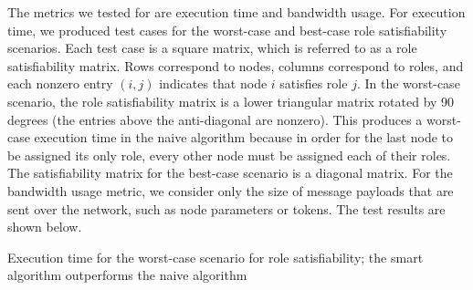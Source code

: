 \documentclass[11pt]{article}
\makeatletter
\newenvironment{figurehere}
{\def\@captype{figure}}
{}
\makeatother
\begin{document}
\begin{multicols}{2}
The metrics we tested for are execution time and bandwidth usage. For execution time, we produced test cases for the worst-case and best-case role satisfiability scenarios. Each test case is a square matrix, which is referred to as a role satisfiability matrix. Rows correspond to nodes, columns correspond to roles, and each nonzero entry $(i, j)$ indicates that node $i$ satisfies role $j$. In the worst-case scenario, the role satisfiability matrix is a lower triangular matrix rotated by 90 degrees (the entries above the anti-diagonal are nonzero). This produces a worst-case execution time in the naive algorithm because in order for the last node to be assigned its only role, every other node must be assigned each of their roles. The satisfiability matrix for the best-case scenario is a diagonal matrix. For the bandwidth usage metric, we consider only the size of message payloads that are sent over the network, such as node parameters or tokens. The test results are shown below.

\begin{figurehere}
\centering
{}
\caption{Execution time for the worst-case scenario for role satisfiability; the smart algorithm outperforms the naive algorithm}
\end{figurehere}
\vspace{.2in}


\end{multicols}
\end{document}
